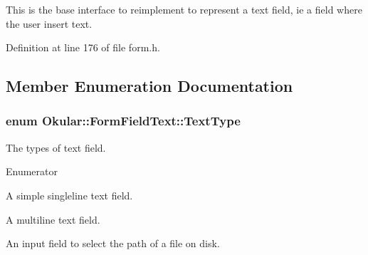This is the base interface to reimplement to represent a text field, ie a field where the user insert text. 

Definition at line 176 of file form.\+h.



\subsection{Member Enumeration Documentation}
\hypertarget{classOkular_1_1FormFieldText_a13b763ea02b44247df564b79996671ba}{
\subsubsection[{Text\+Type}]{\setlength{\rightskip}{0pt plus 5cm}enum {\bf Okular\+::\+Form\+Field\+Text\+::\+Text\+Type}}}\label{classOkular_1_1FormFieldText_a13b763ea02b44247df564b79996671ba}
The types of text field. \begin{Desc}
\item[Enumerator]\par
\begin{description}
\item[{\em 
\hypertarget{classOkular_1_1FormFieldText_a13b763ea02b44247df564b79996671baabf3d7517053b7298f8051cea7f0cf034}{Normal}\label{classOkular_1_1FormFieldText_a13b763ea02b44247df564b79996671baabf3d7517053b7298f8051cea7f0cf034}
}]A simple singleline text field. \item[{\em 
\hypertarget{classOkular_1_1FormFieldText_a13b763ea02b44247df564b79996671baa4cd572a2044a634f8df6a284f595dc2f}{Multiline}\label{classOkular_1_1FormFieldText_a13b763ea02b44247df564b79996671baa4cd572a2044a634f8df6a284f595dc2f}
}]A multiline text field. \item[{\em 
\hypertarget{classOkular_1_1FormFieldText_a13b763ea02b44247df564b79996671baaeaeb6def433745650b1ffd5dacefc7e2}{File\+Select}\label{classOkular_1_1FormFieldText_a13b763ea02b44247df564b79996671baaeaeb6def433745650b1ffd5dacefc7e2}
}]An input field to select the path of a file on disk. \end{description}
\end{Desc}


